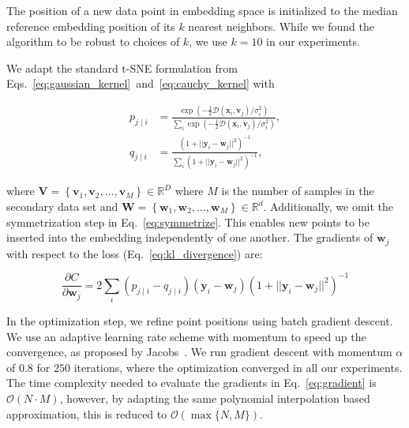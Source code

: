 \documentclass[runningheads]{llncs}
\begin{document}
The position of a new data point in embedding space is initialized to the
median reference embedding position of its $k$ nearest neighbors. While we
found the algorithm to be robust to choices of $k$, we use $k=10$ in our
experiments.

We adapt the standard t-SNE formulation from
Eqs.~\ref{eq:gaussian_kernel}~and~\ref{eq:cauchy_kernel} with

\begin{align}
p_{j \mid i} &= \frac{\exp \left ( -\frac{1}{2} \mathcal{D}(\mathbf{x}_i, \mathbf{v}_j) / \sigma_i^2 \right )}{\sum_{i} \exp \left ( -\frac{1}{2} \mathcal{D}(\mathbf{x}_i, \mathbf{v}_j) / \sigma_i^2 \right )}, \\
q_{j \mid i} &= \frac{\left ( 1 + || \mathbf{y}_i - \mathbf{w}_j ||^2 \right )^{-1}}{\sum_{i}\left ( 1 + || \mathbf{y}_i - \mathbf{w}_j ||^2 \right )^{-1}},
\end{align}

\noindent where $\mathbf{V} = \left \{ \mathbf{v}_1, \mathbf{v}_2, \dots,
\mathbf{v}_M \right \} \in \mathbb{R}^D$ where $M$ is the number of samples in
the secondary data set and $\mathbf{W} = \left \{ \mathbf{w}_1, \mathbf{w}_2, \dots,
\mathbf{w}_M \right \} \in \mathbb{R}^d$. Additionally, we omit the
symmetrization step in Eq.~\ref{eq:symmetrize}. This enables new points to be
inserted into the embedding independently of one another. The gradients of
$\mathbf{w}_j$ with respect to the loss (Eq.~\ref{eq:kl_divergence}) are:

\begin{equation}
\frac{\partial C}{\partial \mathbf{w}_j} = 2 \sum_i \left ( p_{j \mid i} - q_{j \mid i} \right ) \left ( \mathbf{y}_i - \mathbf{w}_j \right ) \left ( 1 + || \mathbf{y}_i - \mathbf{w}_j || ^2 \right )^{-1}
\label{eq:gradient}
\end{equation}

In the optimization step, we refine point positions using batch gradient
descent. We use an adaptive learning rate scheme with momentum to speed up the
convergence, as proposed by Jacobs~\cite{momentum,bh_tsne}. We run gradient
descent with momentum $\alpha$ of $0.8$ for $250$ iterations, where the
optimization converged in all our experiments. The time complexity needed to
evaluate the gradients in Eq.~\ref{eq:gradient} is $\mathcal{O}(N \cdot M)$,
however, by adapting the same polynomial interpolation based approximation,
this is reduced to $\mathcal{O}(\max \{ N, M \})$.
\end{document}
